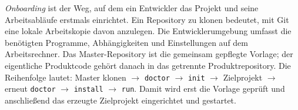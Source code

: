 \begin{beginnerstatement}

\emph{Onboarding} ist der Weg, auf dem ein Entwickler das Projekt und seine
Arbeitsabläufe erstmals einrichtet. Ein Repository zu klonen bedeutet, mit Git
eine lokale Arbeitskopie davon anzulegen. Die Entwicklerumgebung umfasst die
benötigten Programme, Abhängigkeiten und Einstellungen auf dem Arbeitsrechner.
Das Master-Repository ist die gemeinsam gepflegte Vorlage; der eigentliche
Produktcode gehört danach in das getrennte Produktrepository. Die Reihenfolge
lautet: Master klonen \(\rightarrow\) \texttt{doctor} \(\rightarrow\)
\texttt{init} \(\rightarrow\) Zielprojekt \(\rightarrow\) erneut
\texttt{doctor} \(\rightarrow\) \texttt{install} \(\rightarrow\)
\texttt{run}. Damit wird erst die Vorlage geprüft und anschließend das
erzeugte Zielprojekt eingerichtet und gestartet.

\end{beginnerstatement}
